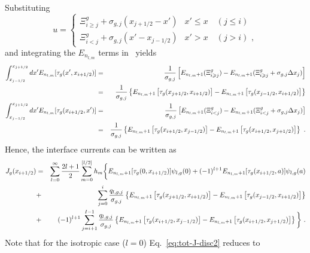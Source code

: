 Substituting 
\begin{equation}\label{eq:usub}
u = \begin{cases}
\Xi^g_{i\geqslant j} + \sigma_{g,j}(x_{j+1/2}-x') & x'\leqslant x \quad (j\leqslant i) \\
\Xi^g_{i<j} + \sigma_{g,j}(x'-x_{j-1/2}) & x'>x \quad (j>i)\,\, ,
\end{cases}
\end{equation} 
and integrating the $E_{n_{l,m}}$ terms in~ yields
\begin{eqnarray}\label{eq:E-int}
\int_{x_{j-1/2}}^{x_{j+1/2}}  dx'
E_{n_{l,m}}[\tau_g(x',x_{i+1/2})] &=& \frac{1}{\sigma_{g,j}}
	\left[
	E_{n_{l,m}+1}(\Xi^g_{i\geqslant j}) 
	- E_{n_{l,m}+1}(\Xi^g_{i\geqslant j	}+\sigma_{g,j}\Delta x_j)
	\right] \nonumber \\
	&=&
	\frac{1}{\sigma_{g,j}}
	\left\{
	E_{n_{l,m}+1}\left[
	\tau_g(x_{j+1/2},x_{i+1/2}) \right] 
	- E_{n_{l,m}+1}\left[
	\tau_g(x_{j-1/2},x_{i+1/2})
	\right] 
	\right\} \nonumber \\	
\int_{x_{j-1/2}}^{x_{j+1/2}} dx'
E_{n_{l,m}}[\tau_g(x_{i+1/2},x')] &=& \frac{1}{\sigma_{g,j}}
\left[
E_{n_{l,m}+1}(\Xi^g_{i<j}) 
- E_{n_{l,m}+1}(\Xi^g_{i<j	}+\sigma_{g,j}\Delta x_j)
\right]\nonumber \\	
	&=&
\frac{1}{\sigma_{g,j}}
\left\{
E_{n_{l,m}+1}\left[
\tau_g(x_{i+1/2},x_{j-1/2}) \right] 
- E_{n_{l,m}+1}\left[
\tau_g(x_{i+1/2},x_{j+1/2})
\right]
\right\}
\,\, .
\end{eqnarray}
Hence, the interface currents can be written as
\begin{eqnarray}\label{eq:tot-J-disc2}
J_g(x_{i+1/2}) &=& \sum\limits_{l=0}^\infty  \frac{2l+1}{2}
\sum\limits_{m=0}^{[l/2]}  h_m
\bigg\{
E_{n_{l,m}+1}[\tau_g(0,x_{i+1/2})] \psi_{l,g}(0) 
+(-1)^{l+1} E_{n_{l,m}+1}[\tau_g(x_{i+1/2},a)]\psi_{l,g}(a)  \nonumber \\
&+&
\sum\limits_{j=0}^i \frac{q_{l,g,j}}{\sigma_{g,j}} 
\left\{
E_{n_{l,m}+1}\left[
\tau_g(x_{j+1/2},x_{i+1/2}) \right] 
- E_{n_{l,m}+1}\left[
\tau_g(x_{j-1/2},x_{i+1/2})
\right] 
\right\}
\nonumber \\
&+&(-1)^{l+1} 
\sum\limits_{j=i+1}^{I-1} \frac{q_{l,g,j}}{\sigma_{g,j}} 
\left\{
E_{n_{l,m}+1}\left[
\tau_g(x_{i+1/2},x_{j-1/2}) \right] 
- E_{n_{l,m}+1}\left[
\tau_g(x_{i+1/2},x_{j+1/2})
\right]
\right\}
\bigg\}	\,\, . 
\end{eqnarray}
Note that for the isotropic case ($l=0$) Eq.~\eqref{eq:tot-J-disc2} reduces  to
